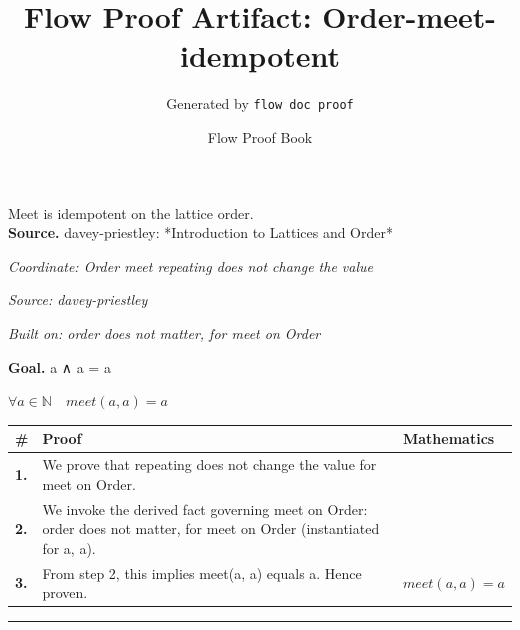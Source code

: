 \documentclass[11pt]{article}
\title{Flow Proof Artifact: Order-meet-idempotent}
\author{Generated by \texttt{flow doc proof}}
\date{Flow Proof Book}
\theoremstyle{definition}
\begin{document}
\maketitle
Meet is idempotent on the lattice order.\\[0.5em]
\textbf{Source.} davey-priestley: *Introduction to Lattices and Order*\\[0.5em]
\bigskip
{}\par
\smallskip\noindent\textit{Coordinate: Order \cdot meet \cdot repeating does not change the value}\par
\smallskip\noindent\textit{Source: davey-priestley}\par
\smallskip\noindent\textit{Built on: order does not matter, for meet on Order}\par
\medskip
\noindent\textbf{Goal.} a ∧ a = a\par
\noindent$\displaystyle \forall a \in \mathbb{N}\quad meet(a, a) = a$\par
\medskip
\noindent
\begin{tabular}{@{} >{\raggedright\arraybackslash}p{} >{\raggedright\arraybackslash}p{} >{\raggedleft\arraybackslash}p{} @{}}
\textbf{\#} & \textbf{Proof} & \textbf{Mathematics} \\
\midrule
\textbf{1.} & We prove that repeating does not change the value for meet on Order. & \\[0.45em]
\textbf{2.} & We invoke the derived fact governing meet on Order: order does not matter, for meet on Order (instantiated for a, a). & \\[0.45em]
\textbf{3.} & From step 2, this implies meet(a, a) equals a. Hence proven. & $\displaystyle meet(a, a) = a$ \\[0.45em]
\bottomrule
\end{tabular}
\label{thm:Order-meet-repeating_does_not_change_the_value}
\par\medskip\hrule
\end{document}
